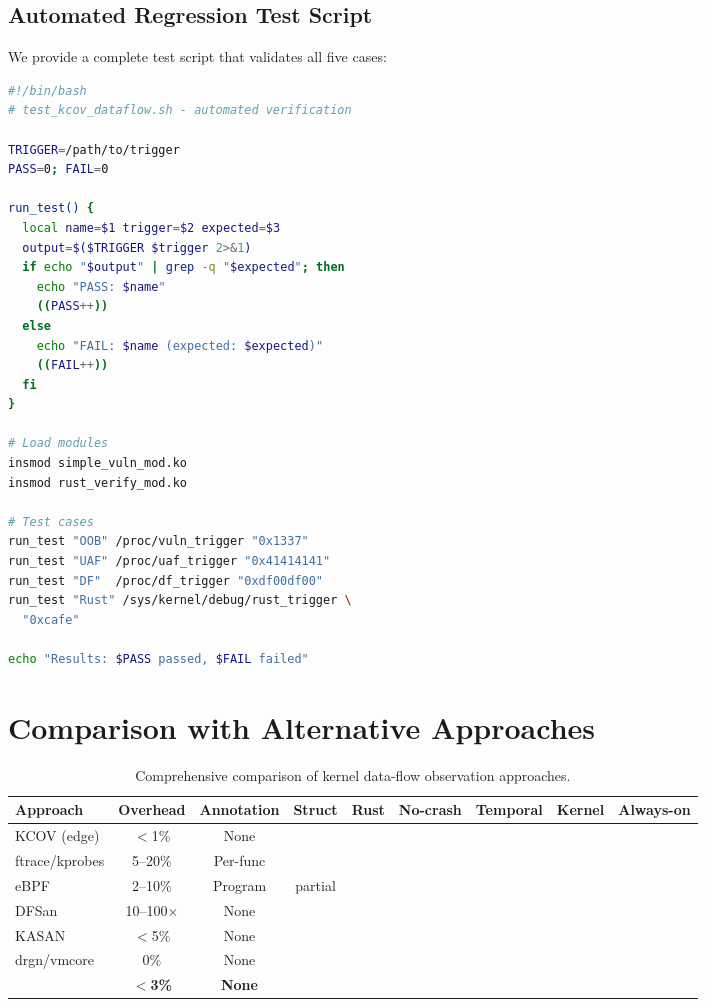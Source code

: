 \documentclass{ndss}
\newcommand{\cmark}{\ding{51}}
\newcommand{\xmark}{\ding{55}}
\begin{document}
\subsection{Automated Regression Test Script}

We provide a complete test script that validates all five cases:
\begin{lstlisting}[language=bash,numbers=none]
#!/bin/bash
# test_kcov_dataflow.sh - automated verification

TRIGGER=/path/to/trigger
PASS=0; FAIL=0

run_test() {
  local name=$1 trigger=$2 expected=$3
  output=$($TRIGGER $trigger 2>&1)
  if echo "$output" | grep -q "$expected"; then
    echo "PASS: $name"
    ((PASS++))
  else
    echo "FAIL: $name (expected: $expected)"
    ((FAIL++))
  fi
}

# Load modules
insmod simple_vuln_mod.ko
insmod rust_verify_mod.ko

# Test cases
run_test "OOB" /proc/vuln_trigger "0x1337"
run_test "UAF" /proc/uaf_trigger "0x41414141"
run_test "DF"  /proc/df_trigger "0xdf00df00"
run_test "Rust" /sys/kernel/debug/rust_trigger \
  "0xcafe"

echo "Results: $PASS passed, $FAIL failed"
\end{lstlisting}

\section{Comparison with Alternative Approaches}\label{app:comparison}

\begin{table}[t]
\centering
\caption{Comprehensive comparison of kernel data-flow observation approaches.}\label{tab:comparison}
\small
\begin{tabular}{@{}lcccccccc@{}}
\toprule
\textbf{Approach} & \textbf{Overhead} & \textbf{Annotation} & \textbf{Struct} & \textbf{Rust} & \textbf{No-crash} & \textbf{Temporal} & \textbf{Kernel} & \textbf{Always-on} \\
\midrule
KCOV (edge) & $<$1\% & None & \xmark & \cmark & \cmark & \xmark & \cmark & \cmark \\
ftrace/kprobes & 5--20\% & Per-func & \xmark & \xmark & \cmark & \cmark & \cmark & \xmark \\
eBPF & 2--10\% & Program & partial & \xmark & \cmark & \cmark & \cmark & \xmark \\
DFSan & 10--100$\times$ & None & \cmark & \xmark & \cmark & \cmark & \xmark & \xmark \\
KASAN & $<$5\% & None & \xmark & \cmark & \xmark & \xmark & \cmark & \cmark \\
drgn/vmcore & 0\% & None & \cmark & \xmark & \xmark & \xmark & \cmark & \xmark \\
\textbf{\toolname{}} & \textbf{$<$3\%} & \textbf{None} & \textbf{\cmark} & \textbf{\cmark} & \textbf{\cmark} & \textbf{\cmark} & \textbf{\cmark} & \textbf{\cmark} \\
\bottomrule
\end{tabular}
\end{table}
\end{document}
